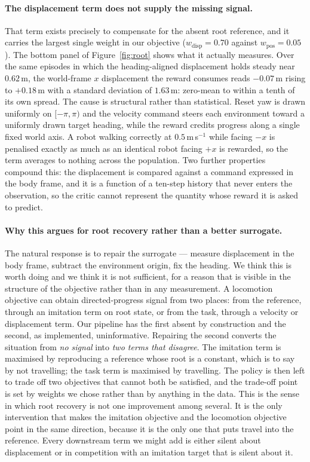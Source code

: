 \documentclass{article}
\theoremstyle{plain}
\theoremstyle{definition}
\theoremstyle{remark}
\begin{document}
\paragraph{The displacement term does not supply the missing signal.} That
term exists precisely to compensate for the absent root reference, and it
carries the largest single weight in our objective ($w_{\text{disp}} = 0.70$
against $w_{\text{pos}} = 0.05$). The bottom panel of Figure~\ref{fig:root}
shows what it actually measures. Over the same episodes in which the
heading-aligned displacement holds steady near $0.62$\,m, the world-frame $x$
displacement the reward consumes reads $-0.07$\,m rising to $+0.18$\,m with a
standard deviation of $1.63$\,m: zero-mean to within a tenth of its own
spread. The cause is structural rather than statistical. Reset yaw is drawn
uniformly on $[-\pi, \pi)$ and the velocity command steers each environment
toward a uniformly drawn target heading, while the reward credits progress
along a single fixed world axis. A robot walking correctly at $0.5$\,m\,s$^{-1}$
while facing $-x$ is penalised exactly as much as an identical robot facing
$+x$ is rewarded, so the term averages to nothing across the population. Two
further properties compound this: the displacement is compared against a
command expressed in the body frame, and it is a function of a ten-step
history that never enters the observation, so the critic cannot represent the
quantity whose reward it is asked to predict.

\paragraph{Why this argues for root recovery rather than a better surrogate.}
The natural response is to repair the surrogate --- measure displacement in
the body frame, subtract the environment origin, fix the heading. We think
this is worth doing and we think it is not sufficient, for a reason that is
visible in the structure of the objective rather than in any measurement. A
locomotion objective can obtain directed-progress signal from two places: from
the reference, through an imitation term on root state, or from the task,
through a velocity or displacement term. Our pipeline has the first absent by
construction and the second, as implemented, uninformative. Repairing the
second converts the situation from \emph{no signal} into \emph{two terms that
disagree}. The imitation term is maximised by reproducing a reference whose
root is a constant, which is to say by not travelling; the task term is
maximised by travelling. The policy is then left to trade off two objectives
that cannot both be satisfied, and the trade-off point is set by weights we
chose rather than by anything in the data. This is the sense in which root
recovery is not one improvement among several. It is the only intervention
that makes the imitation objective and the locomotion objective point in the
same direction, because it is the only one that puts travel into the
reference. Every downstream term we might add is either silent about
displacement or in competition with an imitation target that is silent about
it.
\end{document}
